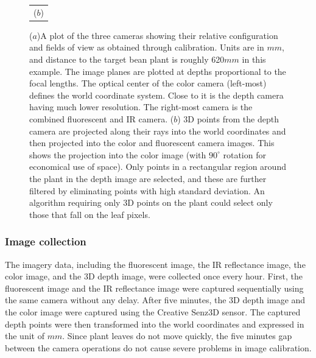 \begin{figure}
\begin{tabular}{c}
  ($b$)\\
\end{tabular}
\caption{($a$)A plot of the three cameras showing their relative configuration and fields of view as obtained through calibration.  Units are in $mm$, and distance to the target bean plant is roughly 620$mm$ in this example.  The image planes are plotted at depths proportional to the focal lengths.  The optical center of the color camera (left-most) defines the world coordinate system.  Close to it is the depth camera having much lower resolution.  The right-most camera is the combined fluorescent and IR camera. ($b$) $3$D points from the depth camera are projected along their rays into the world coordinates and then projected into the color and fluorescent camera images.  This shows the projection into the color image (with $90^{\circ}$ rotation for economical use of space).  Only points in a rectangular region around the plant in the depth image are selected, and these are further filtered by eliminating points with high standard deviation.  An algorithm requiring only $3$D points on the plant could select only those that fall on the leaf pixels.}
\label{fig:CameraConfiguration}
\end{figure}

\subsubsection{Image collection}
The imagery data, including the fluorescent image, the IR reflectance image,  the color image, and the $3$D depth image, were collected once every hour. First, the fluorescent image and the IR reflectance image were captured sequentially using the same camera without any delay.
%
After five minutes, the $3$D depth image and the color image were captured using the Creative Senz3D sensor. The captured depth points were then transformed into the world coordinates and expressed in the unit of $mm$. Since plant leaves do not move quickly, the five minutes gap between the camera operations do not cause severe problems in image calibration.



